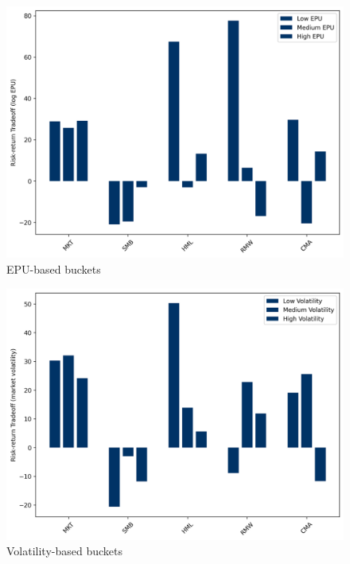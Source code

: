 \begin{figure}[h]
  \centering
  \includegraphics[width=1\linewidth]{Images/EPU-based buckets.png}
  \caption{EPU-based buckets}
  \label{fig:EPU-based buckets}
\end{figure}

\begin{figure}[h]
  \centering
  \includegraphics[width=1\linewidth]{Images/Volatility-based buckets.png}
  \caption{Volatility-based buckets}
  \label{fig:Volatility-based buckets}
\end{figure}
